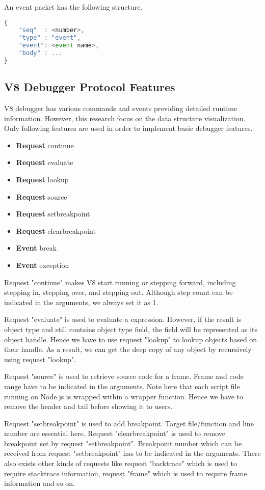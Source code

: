An event packet has the following structure.
\begin{lstlisting}[language=JavaScript]
{
	"seq"  : <number>,
	"type" : "event",
	"event": <event name>,
	"body" : ...
}
\end{lstlisting}

\subsection {V8 Debugger Protocol Features}
V8 debugger has various commands and events providing detailed runtime information. However, this research focus on the data structure visualization. Only following features are used in order to implement basic debugger features.

\begin {itemize}
\item \textbf{Request} continue
\item \textbf{Request} evaluate
\item \textbf{Request} lookup
\item \textbf{Request} source
\item \textbf{Request} setbreakpoint
\item \textbf{Request} clearbreakpoint
\item \textbf{Event} break
\item \textbf{Event} exception
\end {itemize} 

Request "continue" makes V8 start running or stepping forward, including stepping in, stepping over, and stepping out. Although step count can be indicated in the arguments, we always set it as 1.

Request "evaluate" is used to evaluate a expression. However, if the result is object type and still contains object type field, the field will be represented as its object handle. Hence we have to use request "lookup" to lookup objects based on their handle. As a result, we can get the deep copy of any object by recursively using request "lookup".

Request "source" is used to retrieve source code for a frame. Frame and code range have to be indicated in the arguments. Note here that each script file running on Node.js is wrapped within a wrapper function. Hence we have to remove the header and tail before showing it to users.

Request "setbreakpoint" is used to add breakpoint. Target file/function and line number are essential here. Request "clearbreakpoint" is used to remove breakpoint set by request "setbreakpoint". Breakpoint number which can be received from request "setbreakpoint" has to be indicated in the arguments. There also exists other kinds of requests like request "backtrace" which is used to require stacktrace information, request "frame" which is used to require frame information and so on.

